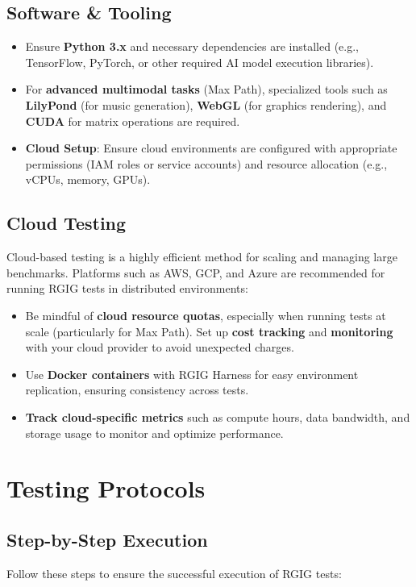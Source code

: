 \subsection*{Software \& Tooling}
\begin{itemize}
  \item Ensure \textbf{Python 3.x} and necessary dependencies are installed (e.g., TensorFlow, PyTorch, or other required AI model execution libraries).
  \item For \textbf{advanced multimodal tasks} (Max Path), specialized tools such as \textbf{LilyPond} (for music generation), \textbf{WebGL} (for graphics rendering), and \textbf{CUDA} for matrix operations are required.
  \item \textbf{Cloud Setup}: Ensure cloud environments are configured with appropriate permissions (IAM roles or service accounts) and resource allocation (e.g., vCPUs, memory, GPUs).
\end{itemize}

\subsection*{Cloud Testing}
Cloud-based testing is a highly efficient method for scaling and managing large benchmarks. Platforms such as AWS, GCP, and Azure are recommended for running RGIG tests in distributed environments:
\begin{itemize}
  \item Be mindful of \textbf{cloud resource quotas}, especially when running tests at scale (particularly for Max Path). Set up \textbf{cost tracking} and \textbf{monitoring} with your cloud provider to avoid unexpected charges.
  \item Use \textbf{Docker containers} with RGIG Harness for easy environment replication, ensuring consistency across tests.
  \item \textbf{Track cloud-specific metrics} such as compute hours, data bandwidth, and storage usage to monitor and optimize performance.
\end{itemize}

\section*{Testing Protocols}

\subsection*{Step-by-Step Execution}
Follow these steps to ensure the successful execution of RGIG tests:

